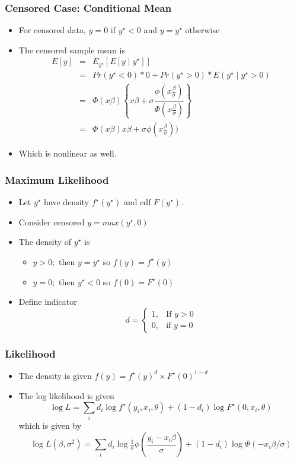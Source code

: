 \documentclass{beamer}
\newcommand{\1}{\mathbb{1}}
\begin{document}
\begin{frame}\frametitle{Censored Case: Conditional Mean}
\begin{itemize}
\item For censored data, $y=0$ if $y^{\star}<0$ and $y=y^{\star}$ otherwise
\item The censored sample mean is 
\begin{eqnarray*}
E[y] &=& E_{y^{\star}}[E[y\mid y^{\star}]] \\
     &=& Pr(y^{\star} <0) * 0 + Pr(y^{\star} >0) * E(y^{\star} \mid y^{\star}>0)\\
     &=& \Phi(x\beta) \left\lbrace x\beta + \sigma \dfrac{\phi(x\tfrac{\beta}{\sigma})}{\Phi(x\tfrac{\beta}{\sigma})} \right\rbrace \\
     &=& \Phi(x\beta) x\beta + \sigma \phi(x\tfrac{\beta}{\sigma}))
\end{eqnarray*}
\item Which is nonlinear as well.
\end{itemize}
\end{frame}

\begin{frame}\frametitle{Maximum Likelihood}
\begin{itemize}
\item Let $y^{\star}$ have density $f^{\star}(y^{\star})$ and cdf $F(y^{\star})$.
\item Consider censored $y = max(y^{\star},0)$
\item The density of $y^{\star}$ is 
\begin{itemize}
\item $y>0;$ then $y=y^{\star}$ so $f(y) = f^{\star}(y)$
\item $y=0;$ then $y^{\star}<0$ so $f(0) = F^{\star}(0)$
\end{itemize}
\item Define indicator
\begin{equation*}
d = \begin{cases} 1, & \mbox{If } y>0 \\ 0, & \mbox{if } y=0 \end{cases}
\end{equation*}
\end{itemize}
\end{frame}

\begin{frame}\frametitle{Likelihood}
\begin{itemize}
\item The density is given $f(y) = f^{\star}(y)^d \times F^{\star}(0)^{1-d}$
\item The log likelihood is given
\begin{equation*}
\log L = \sum_i d_i \log f^{\star}(y_i,x_i,\theta) + (1-d_i) \log F^{\star}(0,x_i,\theta) 
\end{equation*}
which is given by
\begin{equation*}
\log L(\beta,\sigma^2) = \sum_i d_i \log \tfrac{1}{\sigma} \phi \left(\dfrac{y_i-x_i \beta}{\sigma}\right) + (1-d_i) \log  \Phi(-x_i \beta/ \sigma)
\end{equation*}
\end{itemize}
\end{frame}
\end{document}
